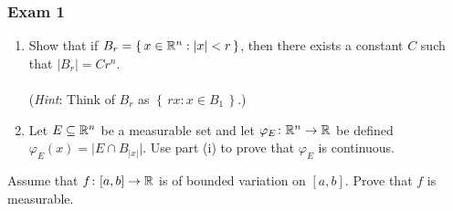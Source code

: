 \subsubsection{Exam 1}
\setcounter{exercise}{0}
\setcounter{equation}{0}

\begin{problem}
\end{problem}
\begin{solution}
\end{solution}

\begin{problem}
\end{problem}
\begin{solution}
\end{solution}

\begin{problem}
\hfill
\begin{enumerate}[label=(\roman*),noitemsep]
\item Show that if \(B_r=\left\{\,x\in\mathbb{R}^n:|x|<r\,\right\}\), then there
  exists a constant \(C\) such that \(|B_r|=Cr^n\).
  \\\\
  (\emph{Hint}: Think of \(B_r\) as \(\left\{\,rx:x\in B_1\,\right\}\).)
\item Let \(E\subseteq\mathbb{R}^n\) be a measurable set and let
  \(\varphi_E\colon\mathbb{R}^n\to\mathbb{R}\) be defined
  \(\varphi_E(x)=\bigl|E\cap B_{|x|}\bigr|\). Use part (i) to prove that
  \(\varphi_E\) is continuous.
\end{enumerate}
\end{problem}
\begin{solution}
\end{solution}

\begin{problem}
  Assume that \(f\colon[a,b]\to\mathbb{R}\) is of bounded variation on
  \([a,b]\). Prove that \(f\) is measurable.
\end{problem}
\begin{solution}
\end{solution}

